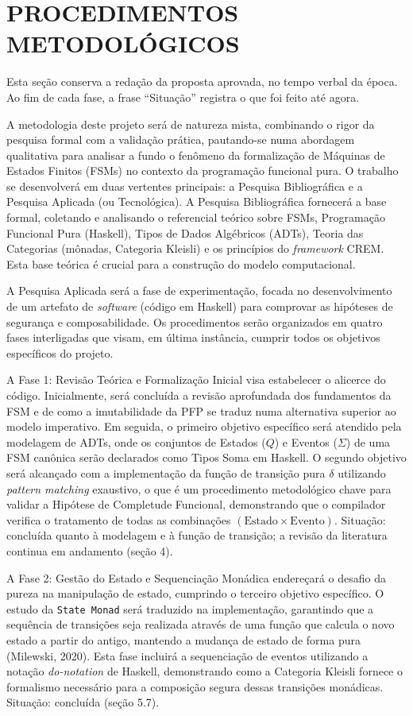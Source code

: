 \documentclass[12pt,a4paper]{article}
\begin{document}
\section{PROCEDIMENTOS METODOLÓGICOS}

Esta seção conserva a redação da proposta aprovada, no tempo verbal da época. Ao fim de cada fase, a frase ``Situação'' registra o que foi feito até agora.

A metodologia deste projeto será de natureza mista, combinando o rigor da pesquisa formal com a validação prática, pautando-se numa abordagem qualitativa para analisar a fundo o fenômeno da formalização de Máquinas de Estados Finitos (FSMs) no contexto da programação funcional pura. O trabalho se desenvolverá em duas vertentes principais: a Pesquisa Bibliográfica e a Pesquisa Aplicada (ou Tecnológica). A Pesquisa Bibliográfica fornecerá a base formal, coletando e analisando o referencial teórico sobre FSMs, Programação Funcional Pura (Haskell), Tipos de Dados Algébricos (ADTs), Teoria das Categorias (mônadas, Categoria Kleisli) e os princípios do \textit{framework} CREM. Esta base teórica é crucial para a construção do modelo computacional.

A Pesquisa Aplicada será a fase de experimentação, focada no desenvolvimento de um artefato de \textit{software} (código em Haskell) para comprovar as hipóteses de segurança e composabilidade. Os procedimentos serão organizados em quatro fases interligadas que visam, em última instância, cumprir todos os objetivos específicos do projeto.

A Fase 1: Revisão Teórica e Formalização Inicial visa estabelecer o alicerce do código. Inicialmente, será concluída a revisão aprofundada dos fundamentos da FSM e de como a imutabilidade da PFP se traduz numa alternativa superior ao modelo imperativo. Em seguida, o primeiro objetivo específico será atendido pela modelagem de ADTs, onde os conjuntos de Estados ($Q$) e Eventos ($\Sigma$) de uma FSM canônica serão declarados como Tipos Soma em Haskell. O segundo objetivo será alcançado com a implementação da função de transição pura $\delta$ utilizando \textit{pattern matching} exaustivo, o que é um procedimento metodológico chave para validar a Hipótese de Completude Funcional, demonstrando que o compilador verifica o tratamento de todas as combinações $(\text{Estado} \times \text{Evento})$. Situação: concluída quanto à modelagem e à função de transição; a revisão da literatura continua em andamento (seção 4).

A Fase 2: Gestão do Estado e Sequenciação Monádica endereçará o desafio da pureza na manipulação de estado, cumprindo o terceiro objetivo específico. O estudo da \texttt{State Monad} será traduzido na implementação, garantindo que a sequência de transições seja realizada através de uma função que calcula o novo estado a partir do antigo, mantendo a mudança de estado de forma pura (Milewski, 2020). Esta fase incluirá a sequenciação de eventos utilizando a notação \textit{do-notation} de Haskell, demonstrando como a Categoria Kleisli fornece o formalismo necessário para a composição segura dessas transições monádicas. Situação: concluída (seção 5.7).
\end{document}

